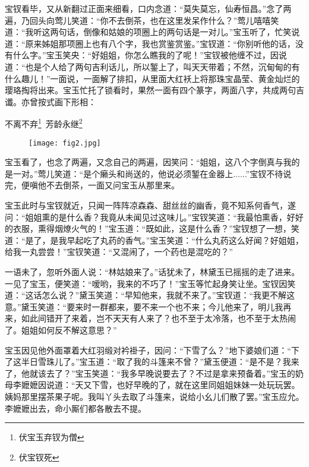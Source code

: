 \documentclass[12pt,oneside]{book}
\begin{document}
宝钗看毕，又从新翻过正面来细看，口内念道：“莫失莫忘，仙寿恒昌。”念了两遍，乃回头向莺儿笑道：“你不去倒茶，也在这里发呆作什么？”莺儿嘻嘻笑道：“我听这两句话，倒像和姑娘的项圈上的两句话是一对儿。”宝玉听了，忙笑说道：“原来姊姐那项圈上也有八个字，我也赏鉴赏鉴。”宝钗道：“你别听他的话，没有什么字。”宝玉笑央：“好姐姐，你怎么瞧我的了呢！”宝钗被他缠不过，因说道：“也是个人给了两句吉利话儿，所以錾上了，叫天天带着；不然，沉甸甸的有什么趣儿！”一面说，一面解了排扣，从里面大红袄上将那珠宝晶莹、黄金灿烂的璎珞掏将出来。宝玉忙托了锁看时，果然一面有四个篆字，两面八字，共成两句吉谶。亦曾按式画下形相：

不离不弃\footnote{伏宝玉弃钗为僧}~芳龄永继\footnote{伏宝钗死}

\begin{figure}[H]
\centering
\texttt{[image: fig2.jpg]}
\end{figure} 


宝玉看了，也念了两遍，又念自己的两遍，因笑问：“姐姐，这八个字倒真与我的是一对。”莺儿笑道：“是个癞头和尚送的，他说必须錾在金器上......”宝钗不待说完，便嗔他不去倒茶，一面又问宝玉从那里来。

宝玉此时与宝钗就近，只闻一阵阵凉森森、甜丝丝的幽香，竟不知系何香气，遂问：“姐姐熏的是什么香？我竟从未闻见过这味儿。”宝钗笑道：“我最怕熏香，好好的衣服，熏得烟燎火气的！”宝玉道：“既如此，这是什么香？”宝钗想了一想，笑道：“是了，是我早起吃了丸药的香气。”宝玉笑道：“什么丸药这么好闻？好姐姐，给我一丸尝尝！”宝钗笑道：“又混闹了，一个药也是混吃的？”

一语未了，忽听外面人说：“林姑娘来了。”话犹未了，林黛玉已摇摇的走了进来。一见了宝玉，便笑道：“嗳哟，我来的不巧了！”宝玉等忙起身笑让坐。宝钗因笑道：“这话怎么说？”黛玉笑道：“早知他来，我就不来了。”宝钗道：“我更不解这意。”黛玉笑道：“要来时一群都来，要不来一个也不来；今儿他来了，明儿我再来，如此间错开了来着，岂不天天有人来了？也不至于太冷落，也不至于太热闹了。姐姐如何反不解这意思？”

宝玉因见他外面罩着大红羽缎对衿褂子，因问：“下雪了么？”地下婆娘们道：“下了这半日雪珠儿了。”宝玉道：“取了我的斗篷来不曾？”黛玉便道：“是不是？我来了，他就该去了？”宝玉笑道：“我多早晚说要去了？不过是拿来预备着。”宝玉的奶母李嬷嬷因说道：“天又下雪，也好早晚的了，就在这里同姐姐妹妹一处玩玩罢。姨妈那里摆茶果子呢。我叫丫头去取了斗篷来，说给小幺儿们散了罢。”宝玉应允。李嬷嬷出去，命小厮们都各散去不提。
\end{document}
